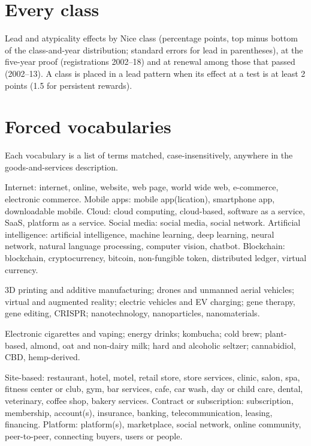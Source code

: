 \appendix
\section{Every class}\label{app:classes}

Lead and atypicality effects by Nice class (percentage points, top minus
bottom of the class-and-year distribution; standard errors for lead in
parentheses), at the five-year proof (registrations 2002--18) and at
renewal among those that passed (2002--13). A class is placed in a lead
pattern when its effect at a test is at least 2 points (1.5 for
persistent rewards).



\section{Forced vocabularies}\label{app:vocab}

Each vocabulary is a list of terms matched, case-insensitively, anywhere
in the goods-and-services description.
\begin{description}\small
\item[General-purpose technologies.] Internet: internet, online,
website, web page, world wide web, e-commerce, electronic commerce.
Mobile apps: mobile app(lication), smartphone app, downloadable mobile.
Cloud: cloud computing, cloud-based, software as a service, SaaS,
platform as a service. Social media: social media, social network.
Artificial intelligence: artificial intelligence, machine learning, deep
learning, neural network, natural language processing, computer vision,
chatbot. Blockchain: blockchain, cryptocurrency, bitcoin, non-fungible
token, distributed ledger, virtual currency.
\item[Inventions.] 3D printing and additive manufacturing; drones and
unmanned aerial vehicles; virtual and augmented reality; electric
vehicles and EV charging; gene therapy, gene editing, CRISPR;
nanotechnology, nanoparticles, nanomaterials.
\item[Emergent consumer categories.] Electronic cigarettes and vaping;
energy drinks; kombucha; cold brew; plant-based, almond, oat and
non-dairy milk; hard and alcoholic seltzer; cannabidiol, CBD,
hemp-derived.
\item[Kinds of business.] Site-based: restaurant, hotel, motel, retail
store, store services, clinic, salon, spa, fitness center or club, gym,
bar services, cafe, car wash, day or child care, dental, veterinary,
coffee shop, bakery services. Contract or subscription: subscription,
membership, account(s), insurance, banking, telecommunication, leasing,
financing. Platform: platform(s), marketplace, social network, online
community, peer-to-peer, connecting buyers, users or people.
\end{description}



